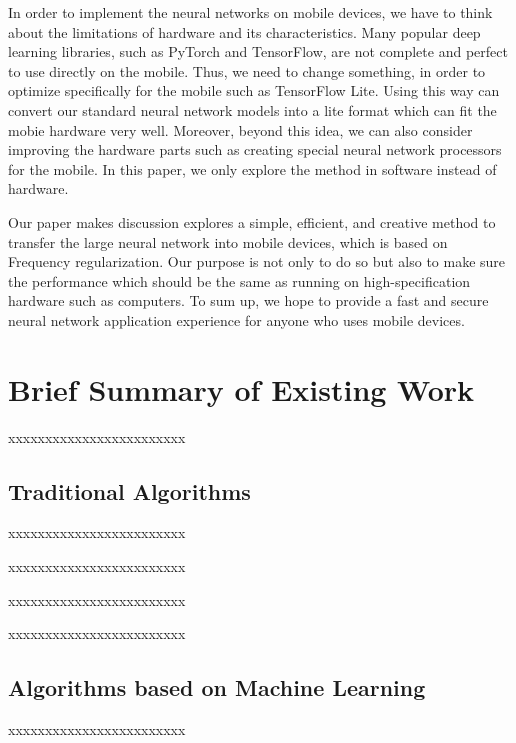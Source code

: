 \documentclass[UTF8]{article}
\begin{document}
In order to implement the neural networks on mobile devices, we have to think about the limitations of hardware and its characteristics. Many popular deep learning libraries, such as PyTorch and TensorFlow, are not complete and perfect to use directly on the mobile. Thus, we need to change something, in order to optimize specifically for the mobile such as TensorFlow Lite. Using this way can convert our standard neural network models into a lite format which can fit the mobie hardware very well. Moreover, beyond this idea, we can also consider improving the hardware parts such as creating special neural network processors for the mobile. In this paper, we only explore the method in software instead of hardware.

Our paper makes discussion explores a simple, efficient, and creative method to transfer the large neural network into mobile devices, which is based on Frequency regularization. Our purpose is not only to do so but also to make sure the performance which should be the same as running on high-specification hardware such as computers. To sum up, we hope to provide a fast and secure neural network application experience for anyone who uses mobile devices.



\section*{Brief Summary of Existing Work}

xxxxxxxxxxxxxxxxxxxxxxxx

\subsection{Traditional Algorithms}
xxxxxxxxxxxxxxxxxxxxxxxx

xxxxxxxxxxxxxxxxxxxxxxxx

xxxxxxxxxxxxxxxxxxxxxxxx

xxxxxxxxxxxxxxxxxxxxxxxx

\subsection{Algorithms based on Machine Learning}
xxxxxxxxxxxxxxxxxxxxxxxx
\end{document}
